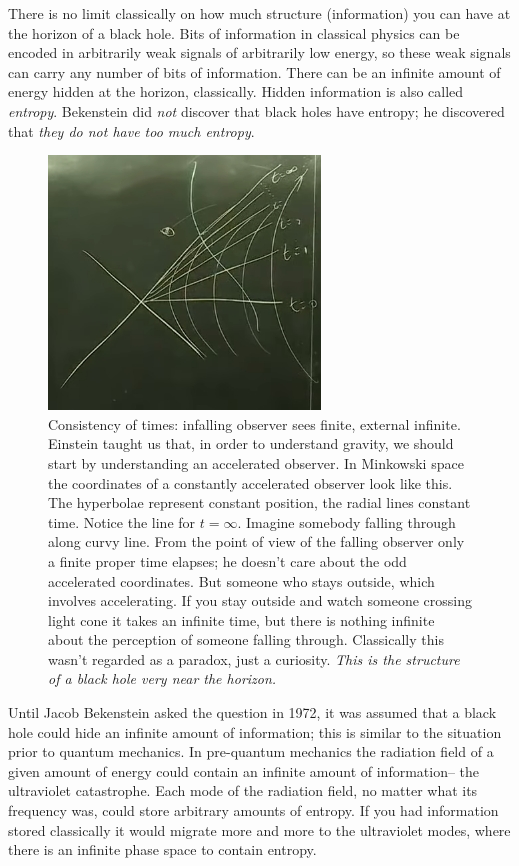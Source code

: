 \documentclass[]{article}
\begin{document}
There is no limit classically on how much structure (information) you can have at the horizon of a black hole. Bits of information in classical physics can be encoded in arbitrarily weak signals of arbitrarily low energy, so these weak signals can carry any number of bits of information. There can be an infinite amount of energy hidden at the horizon, classically. Hidden information is also called \emph{entropy}.
Bekenstein did \emph{not} discover that black holes have entropy; he discovered that \emph{they do not have too much entropy}.

\begin{figure}[H]
	\begin{center}
		\caption[Consistency of times: infalling observer sees finite, external infinite.]{Consistency of times: infalling observer sees finite, external infinite. Einstein taught us that, in order to understand gravity, we should start by understanding an accelerated observer. In Minkowski space the coordinates of a constantly accelerated observer look like this. The hyperbolae represent constant position, the radial lines constant time. Notice the line for $t=\infty$. Imagine somebody falling through along curvy line. From the point of view of the falling observer only a finite proper time elapses; he doesn't care about the odd accelerated coordinates. But someone who stays outside, which involves accelerating. If you stay outside and watch someone crossing light cone it takes an infinite time, but there is nothing infinite about the perception of someone falling through. Classically this wasn't regarded as a paradox, just a curiosity. \emph{This is the structure of a black hole very near the horizon.} }\label{fig:ibh-minkowski}
		\includegraphics{ibh-minkowski}
	\end{center}
\end{figure}

Until Jacob Bekenstein\cite{wiki:jacob:bekenstein} asked the question in 1972, it was assumed that a black hole could hide an infinite amount of information; this is similar to the situation prior to quantum mechanics. In pre-quantum mechanics the radiation field of a given amount of energy could contain an infinite amount of information-- the ultraviolet catastrophe. Each mode of the radiation field, no matter what its frequency was, could store arbitrary amounts of entropy. If you had information stored classically it would migrate more and more to the ultraviolet modes, where there is an infinite phase space to contain entropy. 
\end{document}
